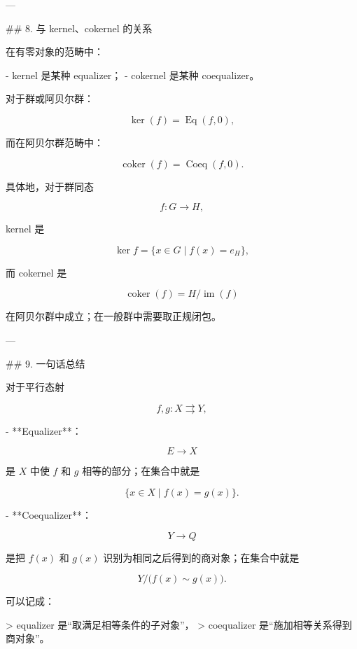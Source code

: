 \documentclass{ctexart}
\begin{document}
\begin{markdown}
---

## 8. 与 kernel、cokernel 的关系

在有零对象的范畴中：

- kernel 是某种 equalizer；
- cokernel 是某种 coequalizer。

对于群或阿贝尔群：

$$
\ker(f)=\operatorname{Eq}(f,0),
$$

而在阿贝尔群范畴中：

$$
\operatorname{coker}(f)=\operatorname{Coeq}(f,0).
$$

具体地，对于群同态

$$
f:G\to H,
$$

kernel 是

$$
\ker f=\{x\in G\mid f(x)=e_H\},
$$

而 cokernel 是

$$
\operatorname{coker}(f)=H/\operatorname{im}(f)
$$

在阿贝尔群中成立；在一般群中需要取正规闭包。

---

## 9. 一句话总结

对于平行态射

$$
f,g:X\rightrightarrows Y,
$$

- **Equalizer**：

$$
E\to X
$$

是 $X$ 中使 $f$ 和 $g$ 相等的部分；在集合中就是

$$
\{x\in X\mid f(x)=g(x)\}.
$$

- **Coequalizer**：

$$
Y\to Q
$$

是把 $f(x)$ 和 $g(x)$ 识别为相同之后得到的商对象；在集合中就是

$$
Y/\bigl(f(x)\sim g(x)\bigr).
$$

可以记成：

> equalizer 是“取满足相等条件的子对象”，  
> coequalizer 是“施加相等关系得到商对象”。
\end{markdown}
\end{document}
